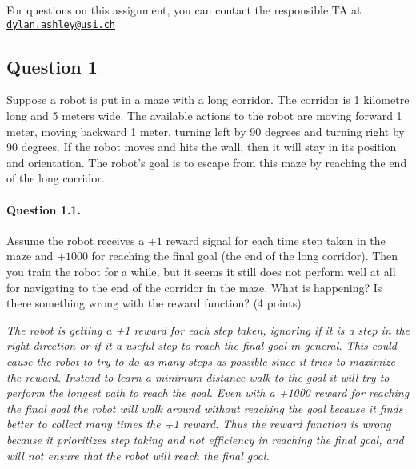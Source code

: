 \documentclass[a4paper,11pt]{article}
\begin{document}
\vspace{1em}\noindent For questions on this assignment, you can contact the responsible TA at \href{mailto:dylan.ashley@usi.ch}{\texttt{dylan.ashley@usi.ch}}

\clearpage

\subsection*{Question 1}
Suppose a robot is put in a maze with a long corridor.
The corridor is 1 kilometre long and 5 meters wide.
The available actions to the robot are moving forward 1 meter, moving backward 1 meter, turning left by 90 degrees and turning right by 90 degrees.
If the robot moves and hits the wall, then it will stay in its position and orientation.
The robot's goal is to escape from this maze by reaching the end of the long corridor.

\begin{minipage}{0.9\textwidth}
\vspace{.5cm}
\paragraph{Question 1.1.}
Assume the robot receives a $+1$ reward signal for each time step taken in the maze and $+1000$ for reaching the final goal (the end of the long corridor).
Then you train the robot for a while, but it seems it still does not perform well at all for navigating to the end of the corridor in the maze.
What is happening?
Is there something wrong with the reward function?
(4 points)
\vspace{.5cm}

\textit{The robot is getting a +1 reward for each step taken, ignoring if it is a step in the right direction or if it a useful step to reach the final goal in general. This could cause the robot to try to do as many steps as possible since it tries to maximize the reward. Instead to learn a minimum distance walk to the goal it will try to perform the longest path to reach the goal. Even with a +1000 reward for reaching the final goal the robot will walk around without reaching the goal because it finds better to collect many times the +1 reward. Thus the reward function is wrong because it prioritizes step taking and not efficiency in reaching the final goal, and will not ensure that the robot will reach the final goal. }

\end{minipage}
\end{document}
